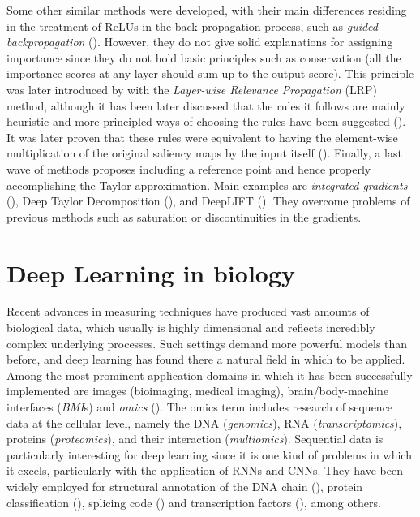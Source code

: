 Some other similar methods were developed, with their main differences residing in the treatment of ReLUs in the back-propagation process, such as \textit{guided backpropagation} (\cite{Springenberg2014}). However, they do not give solid explanations for assigning importance since they do not hold basic principles such as conservation (all the importance scores at any layer should sum up to the output score). This principle was later introduced by \cite{Bach2015} with the \textit{Layer-wise Relevance Propagation} (LRP) method, although it has been later discussed that the rules it follows are mainly heuristic and more principled ways of choosing the rules have been suggested (\cite{Montavon2017}). It was later proven that these rules were equivalent to having the element-wise multiplication of the original saliency maps by the input itself (\cite{Shrikumar2016}). Finally, a last wave of methods proposes including a reference point and hence properly accomplishing the Taylor approximation. Main examples are \textit{integrated gradients} (\cite{Sundararajan2017}), Deep Taylor Decomposition (\cite{Montavon2017}), and DeepLIFT (\cite{Shrikumar2017}). They overcome problems of previous methods such as saturation or discontinuities in the gradients.

\section{Deep Learning in biology}

Recent advances in measuring techniques have produced vast amounts of biological data, which usually is highly dimensional and reflects incredibly complex underlying processes. Such settings demand more powerful models than before, and deep learning has found there a natural field in which to be applied. Among the most prominent application domains in which it has been successfully implemented are images (bioimaging, medical imaging), brain/body-machine interfaces (\textit{BMI}s) and \textit{omics} (\cite{Mahmud2018}). The omics term includes research of sequence data at the cellular level, namely the DNA (\textit{genomics}), RNA (\textit{transcriptomics}), proteins (\textit{proteomics}), and their interaction (\textit{multiomics}). Sequential data is particularly interesting for deep learning since it is one kind of problems in which it excels, particularly with the application of RNNs and CNNs. They have been widely employed for structural annotation of the DNA chain (\cite{Jones2017}), protein classification (\cite{Min2017}), splicing code (\cite{Mamoshina2016}) and transcription factors (\cite{Ching2017}), among others.

